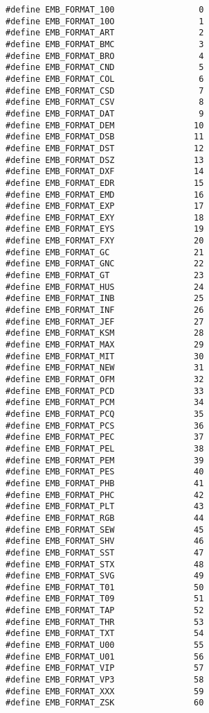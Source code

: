 \begin{verbatim}
#define EMB_FORMAT_100                 0
#define EMB_FORMAT_10O                 1
#define EMB_FORMAT_ART                 2
#define EMB_FORMAT_BMC                 3
#define EMB_FORMAT_BRO                 4
#define EMB_FORMAT_CND                 5
#define EMB_FORMAT_COL                 6
#define EMB_FORMAT_CSD                 7
#define EMB_FORMAT_CSV                 8
#define EMB_FORMAT_DAT                 9
#define EMB_FORMAT_DEM                10
#define EMB_FORMAT_DSB                11
#define EMB_FORMAT_DST                12
#define EMB_FORMAT_DSZ                13
#define EMB_FORMAT_DXF                14
#define EMB_FORMAT_EDR                15
#define EMB_FORMAT_EMD                16
#define EMB_FORMAT_EXP                17
#define EMB_FORMAT_EXY                18
#define EMB_FORMAT_EYS                19
#define EMB_FORMAT_FXY                20
#define EMB_FORMAT_GC                 21
#define EMB_FORMAT_GNC                22
#define EMB_FORMAT_GT                 23
#define EMB_FORMAT_HUS                24
#define EMB_FORMAT_INB                25
#define EMB_FORMAT_INF                26
#define EMB_FORMAT_JEF                27
#define EMB_FORMAT_KSM                28
#define EMB_FORMAT_MAX                29
#define EMB_FORMAT_MIT                30
#define EMB_FORMAT_NEW                31
#define EMB_FORMAT_OFM                32
#define EMB_FORMAT_PCD                33
#define EMB_FORMAT_PCM                34
#define EMB_FORMAT_PCQ                35
#define EMB_FORMAT_PCS                36
#define EMB_FORMAT_PEC                37
#define EMB_FORMAT_PEL                38
#define EMB_FORMAT_PEM                39
#define EMB_FORMAT_PES                40
#define EMB_FORMAT_PHB                41
#define EMB_FORMAT_PHC                42
#define EMB_FORMAT_PLT                43
#define EMB_FORMAT_RGB                44
#define EMB_FORMAT_SEW                45
#define EMB_FORMAT_SHV                46
#define EMB_FORMAT_SST                47
#define EMB_FORMAT_STX                48
#define EMB_FORMAT_SVG                49
#define EMB_FORMAT_T01                50
#define EMB_FORMAT_T09                51
#define EMB_FORMAT_TAP                52
#define EMB_FORMAT_THR                53
#define EMB_FORMAT_TXT                54
#define EMB_FORMAT_U00                55
#define EMB_FORMAT_U01                56
#define EMB_FORMAT_VIP                57
#define EMB_FORMAT_VP3                58
#define EMB_FORMAT_XXX                59
#define EMB_FORMAT_ZSK                60
\end{verbatim}

